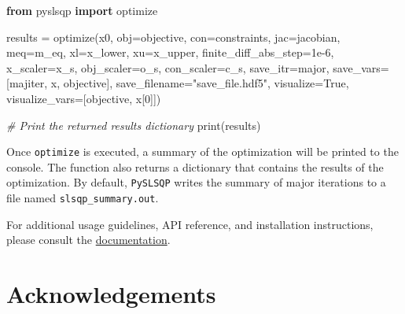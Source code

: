 \documentclass[
]{article}
\newenvironment{Shaded}{}{}
\newcommand{\BuiltInTok}[1]{\textcolor[rgb]{0.00,0.50,0.00}{#1}}
\newcommand{\CommentTok}[1]{\textcolor[rgb]{0.38,0.63,0.69}{\textit{#1}}}
\newcommand{\FloatTok}[1]{\textcolor[rgb]{0.25,0.63,0.44}{#1}}
\newcommand{\ImportTok}[1]{\textcolor[rgb]{0.00,0.50,0.00}{\textbf{#1}}}
\newcommand{\NormalTok}[1]{#1}
\newcommand{\OperatorTok}[1]{\textcolor[rgb]{0.40,0.40,0.40}{#1}}
\newcommand{\StringTok}[1]{\textcolor[rgb]{0.25,0.44,0.63}{#1}}
\newcommand{\VariableTok}[1]{\textcolor[rgb]{0.10,0.09,0.49}{#1}}
\begin{document}
\begin{Shaded}
\begin{Highlighting}[]
\ImportTok{from}\NormalTok{ pyslsqp }\ImportTok{import}\NormalTok{ optimize}

\NormalTok{results }\OperatorTok{=}\NormalTok{ optimize(x0, obj}\OperatorTok{=}\NormalTok{objective, con}\OperatorTok{=}\NormalTok{constraints, jac}\OperatorTok{=}\NormalTok{jacobian, }
\NormalTok{                   meq}\OperatorTok{=}\NormalTok{m\_eq, xl}\OperatorTok{=}\NormalTok{x\_lower, xu}\OperatorTok{=}\NormalTok{x\_upper, finite\_diff\_abs\_step}\OperatorTok{=}\FloatTok{1e{-}6}\NormalTok{,}
\NormalTok{                   x\_scaler}\OperatorTok{=}\NormalTok{x\_s, obj\_scaler}\OperatorTok{=}\NormalTok{o\_s, con\_scaler}\OperatorTok{=}\NormalTok{c\_s,}
\NormalTok{                   save\_itr}\OperatorTok{=}\StringTok{\textquotesingle{}major\textquotesingle{}}\NormalTok{, save\_vars}\OperatorTok{=}\NormalTok{[}\StringTok{\textquotesingle{}majiter\textquotesingle{}}\NormalTok{, }\StringTok{\textquotesingle{}x\textquotesingle{}}\NormalTok{, }\StringTok{\textquotesingle{}objective\textquotesingle{}}\NormalTok{],}
\NormalTok{                   save\_filename}\OperatorTok{=}\StringTok{"save\_file.hdf5"}\NormalTok{,}
\NormalTok{                   visualize}\OperatorTok{=}\VariableTok{True}\NormalTok{, visualize\_vars}\OperatorTok{=}\NormalTok{[}\StringTok{\textquotesingle{}objective\textquotesingle{}}\NormalTok{, }\StringTok{\textquotesingle{}x[0]\textquotesingle{}}\NormalTok{])}

\CommentTok{\# Print the returned results dictionary}
\BuiltInTok{print}\NormalTok{(results)}
\end{Highlighting}
\end{Shaded}

Once \texttt{optimize} is executed, a summary of the optimization will
be printed to the console. The function also returns a dictionary that
contains the results of the optimization. By default, \texttt{PySLSQP}
writes the summary of major iterations to a file named
\texttt{slsqp\_summary.out}.

For additional usage guidelines, API reference, and installation
instructions, please consult the
\href{https://pyslsqp.readthedocs.io/}{documentation}.

\section{Acknowledgements}\label{acknowledgements}
\end{document}

